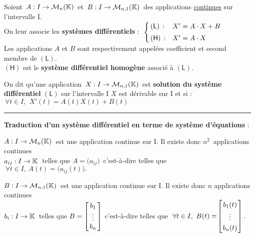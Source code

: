 \newpage

Soient \(\,A:I\to \mathcal{M}_n(\mathbb{K})\,\) et \(\,B:I\to \mathcal{M}_{n,1}(\mathbb{K})\,\) des applications \underline{continues} sur l'intervalle I.\vspace{0.3cm}\\
On leur associe les \textbf{systèmes différentiels} : \(\ \left\{\!\! 
\begin{array}{ll}
    (\mathsf{L})\,: & X'=A\cdot X+B\vspace{0.1cm}\\
    (\mathsf{H})\,: & X'=A\cdot X
\end{array}\right.\)\vspace{0.4cm}\\
Les applications $A$ et $B$ sont respectivement appelées coefficient et second membre de $(\mathsf{L})$.\\
$(\mathsf{H})$ est le \textbf{système différentiel homogène} associé à $(\mathsf{L})$.

\vspace{1.2cm}

On dit qu'une application \(\,X:I\to \mathcal{M}_{n,1}(\mathbb{K})\,\) est \textbf{solution du système différentiel} \((\mathsf{L})\) sur l'intervalle I \ssi $X$ est dérivable sur I et si : \(\, \forall t\in I,\ \, X'(t)=A(t)X(t)+B(t)\)

\vspace{1.3cm}

\hrule

\vspace{1cm}

\begin{center}
\textbf{Traduction d'un système différentiel en terme de système d'équations} :
\end{center} \vspace{0.7cm}

\(A:I\to \mathcal{M}_n(\mathbb{K})\,\) est une application continue sur I. Il existe donc $n^2\,$ applications continues\\
\(a_{ij}:I\to \mathbb{K} \: \) telles que \(A=\!\bigl(a_{ij}\bigr)\,\) c'est-à-dire telles que \(\ \forall t \in I,\ A(t)=\bigl(a_{ij}(t)\bigr).\)\vspace{1.3cm}

\(B:I\to \mathcal{M}_{n,1}(\mathbb{K})\,\) est une application continue sur I. Il existe donc $n$ applications continues\\
\(b_i:I\to \mathbb{K} \: \) telles que \(B=\arraycolsep=0.05cm\def\arraystretch{1} \left[
\begin{array}{c}
    b_1\\
    \vdots\\
    b_n
\end{array}    
\right]\) c'est-à-dire telles que \(\ \forall t \in I,\ B(t)=\!\arraycolsep=0.03cm\def\arraystretch{1.2}\left[
    \begin{array}{c}
        b_1(t)\\
        \vdots\\
        b_n(t)
    \end{array}    
    \right].\)

